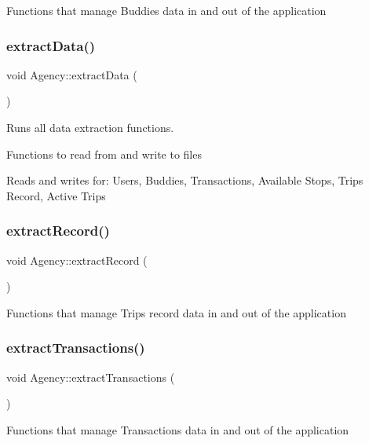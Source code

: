 Functions that manage Buddies data in and out of the application \mbox{\label{group___agency_ga20bc20b90914b5e446b683dcd7f6d0ef}} 
\subsubsection{\texorpdfstring{extract\+Data()}{extractData()}}
{\footnotesize\ttfamily void Agency\+::extract\+Data (\begin{DoxyParamCaption}{ }\end{DoxyParamCaption})}



Runs all data extraction functions. 

Functions to read from and write to files

Reads and writes for\+: Users, Buddies, Transactions, Available Stops, Trips Record, Active Trips \mbox{\label{group___agency_ga8cafe0f0410e881f1a0d7a1bdd502058}} 
\subsubsection{\texorpdfstring{extract\+Record()}{extractRecord()}}
{\footnotesize\ttfamily void Agency\+::extract\+Record (\begin{DoxyParamCaption}{ }\end{DoxyParamCaption})}

Functions that manage Trips record data in and out of the application \mbox{\label{group___agency_gadfda62c1a33db5f797098d0391e6ee87}} 
\subsubsection{\texorpdfstring{extract\+Transactions()}{extractTransactions()}}
{\footnotesize\ttfamily void Agency\+::extract\+Transactions (\begin{DoxyParamCaption}{ }\end{DoxyParamCaption})}

Functions that manage Transactions data in and out of the application \mbox{\label{group___agency_ga659e4c6df03779b524f37b1c8fb5221d}} 
